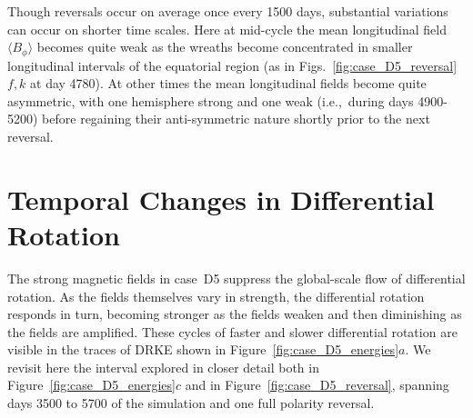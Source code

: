 Though reversals occur on average once every 1500 days,
substantial variations can occur on shorter time scales.  
Here at mid-cycle the mean longitudinal field $\langle B_\phi \rangle$
becomes quite weak as the wreaths become concentrated in smaller
longitudinal intervals of the equatorial region (as in
Figs.~\ref{fig:case_D5_reversal}$f,k$ at day 4780).  At other times 
the mean longitudinal fields become quite asymmetric, with one
hemisphere strong and one weak (i.e.,~during days 4900-5200) before
regaining their anti-symmetric nature shortly prior to the next reversal. 




\section{Temporal Changes in Differential Rotation}
The strong magnetic fields in case~D5 suppress the
global-scale flow of differential rotation.  
As the fields themselves vary in strength, the differential rotation
responds in turn, becoming stronger as the fields weaken and then
diminishing as the fields are amplified.  These cycles of faster and
slower differential rotation are visible in the traces of DRKE shown
in Figure~\ref{fig:case_D5_energies}$a$.  
We revisit here the interval explored in closer detail both in
Figure~\ref{fig:case_D5_energies}$c$ and in
Figure~\ref{fig:case_D5_reversal}, spanning days 3500 to 5700 of the
simulation and one full polarity reversal.  


